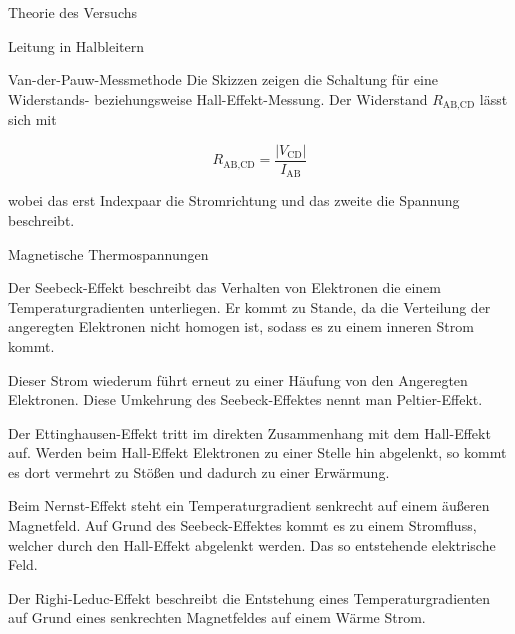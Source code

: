 \documentclass[pdftex, a4paper,11pt, twoside, ngerman]{report}
\newcommand\abs[1]{\left| #1 \right|}
\begin{document}
\begin{chapter}{Theorie des Versuchs}
\begin{section}{Leitung in Halbleitern}
\begin{subsection}{Van-der-Pauw-Messmethode}
            Die Skizzen zeigen die Schaltung für eine Widerstands- beziehungsweise Hall-Effekt-Messung.
            Der Widerstand $R_\text{AB,CD}$ lässt sich mit 
            
            \begin{equation}
                R_\text{AB,CD} = \frac{\abs{V_\text{CD}}}{I_\text{AB}}
            \end{equation}
            
            wobei das erst Indexpaar die Stromrichtung und das zweite die Spannung beschreibt. 

        \end{subsection}

        \begin{subsection}{Magnetische Thermospannungen}

                Der Seebeck-Effekt beschreibt das Verhalten von Elektronen die einem Temperaturgradienten unterliegen. 
                Er kommt zu Stande, da die Verteilung der angeregten Elektronen nicht homogen ist, sodass es zu einem inneren Strom kommt.
                
                Dieser Strom wiederum führt erneut zu einer Häufung von den Angeregten Elektronen.
                Diese Umkehrung des Seebeck-Effektes nennt man Peltier-Effekt.


                Der Ettinghausen-Effekt tritt im direkten Zusammenhang mit dem Hall-Effekt auf.
                Werden beim Hall-Effekt Elektronen zu einer Stelle hin abgelenkt, so kommt es dort vermehrt zu Stößen und dadurch zu einer Erwärmung.
                
                Beim Nernst-Effekt steht ein Temperaturgradient senkrecht auf einem äußeren Magnetfeld.
                Auf Grund des Seebeck-Effektes kommt es zu einem Stromfluss, welcher durch den Hall-Effekt abgelenkt werden.
                Das so entstehende elektrische Feld.


                Der Righi-Leduc-Effekt beschreibt die Entstehung eines Temperaturgradienten auf Grund eines senkrechten Magnetfeldes auf einem Wärme Strom.


\end{subsection}
\end{section}
\end{chapter}
\end{document}

